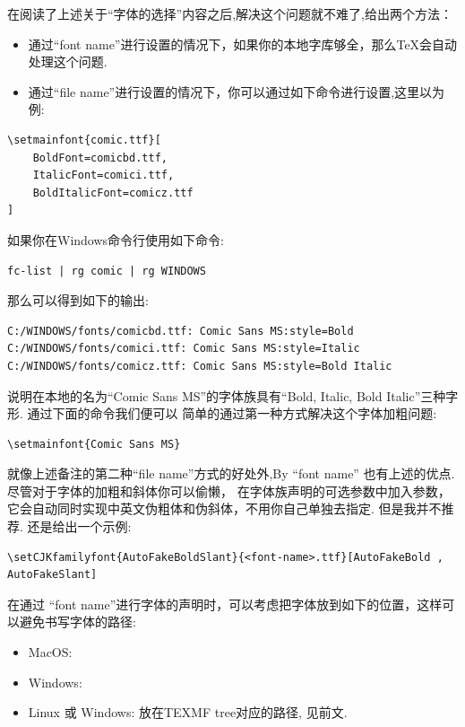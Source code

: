 



在阅读了上述关于``字体的选择''内容之后,解决这个问题就不难了,给出两个方法：
\begin{itemize}
    \item 通过``font name''进行设置的情况下，如果你的本地字库够全，那么\TeX{}会自动处理这个问题.
    \item 通过``file name''进行设置的情况下，你可以通过如下命令进行设置,这里以为例:
\end{itemize}

\begin{verbatim}
\setmainfont{comic.ttf}[
    BoldFont=comicbd.ttf,
    ItalicFont=comici.ttf,
    BoldItalicFont=comicz.ttf
]
\end{verbatim}

如果你在Windows命令行使用如下命令:
\begin{verbatim}
fc-list | rg comic | rg WINDOWS
\end{verbatim}

那么可以得到如下的输出:
\begin{verbatim}
C:/WINDOWS/fonts/comicbd.ttf: Comic Sans MS:style=Bold
C:/WINDOWS/fonts/comici.ttf: Comic Sans MS:style=Italic
C:/WINDOWS/fonts/comicz.ttf: Comic Sans MS:style=Bold Italic
\end{verbatim}

说明在本地的名为``Comic Sans MS''的字体族具有``Bold, Italic, Bold Italic''三种字形. 通过下面的命令我们便可以
简单的通过第一种方式解决这个字体加粗问题:
\begin{verbatim}
\setmainfont{Comic Sans MS}
\end{verbatim}

\begin{remark}%
就像上述备注的第二种``file name''方式的好处外,By ``font name'' 也有上述的优点. 尽管对于字体的加粗和斜体你可以偷懒，
在字体族声明的可选参数中加入参数，它会自动同时实现中英文伪粗体和伪斜体，不用你自己单独去指定.
但是我并不推荐. 还是给出一个示例:
\end{remark}

\begin{verbatim}
\setCJKfamilyfont{AutoFakeBoldSlant}{<font-name>.ttf}[AutoFakeBold , AutoFakeSlant]
\end{verbatim}

在通过 ``font name''进行字体的声明时，可以考虑把字体放到如下的位置，这样可以避免书写字体的路径:
\begin{itemize}
    \item MacOS:
    \item Windows:
    \item Linux 或 Windows: 放在TEXMF tree对应的路径, 见前文.
\end{itemize}

